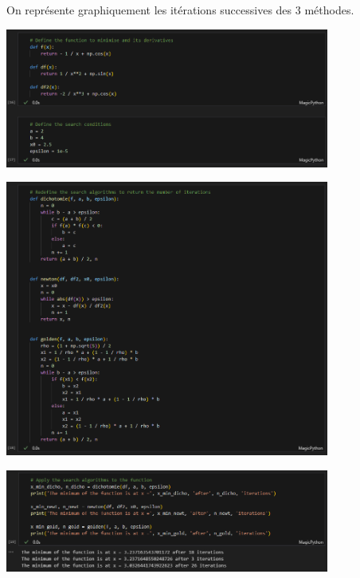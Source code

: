 {\begin{td-sol}
\begin{enumerate}
            On représente graphiquement les itérations successives des 3 méthodes.
            \begin{center}
                \includegraphics[width=0.8\textwidth]{../assets/code_07_compare.png}
            \end{center}
            
            \begin{center}
                \includegraphics[width=0.8\textwidth]{../assets/code_08_redefine.png}
            \end{center}
            
            \begin{center}
                \includegraphics[width=0.8\textwidth]{../assets/code_09_results.png}
            \end{center}
            

\end{enumerate}
\end{td-sol}}
